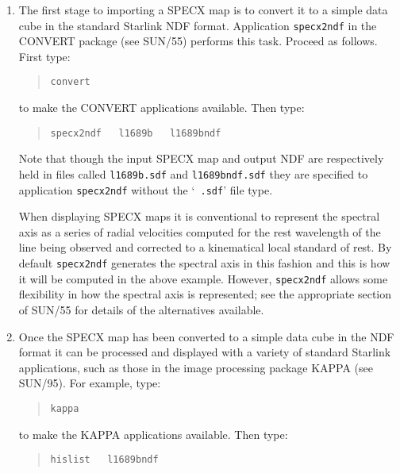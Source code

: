 \documentclass[twoside,11pt]{article}
\newcommand{\xref}[3]{#1}
\begin{document}
\begin{enumerate}

  \item The first stage to importing a SPECX map is to convert it to a
   simple data cube in the standard Starlink \xref{NDF}{sun33}{}
   format.  Application {\tt specx2ndf} in the CONVERT package
   (see \xref{SUN/55}{sun55}{}\cite{SUN55}) performs this task.
   Proceed as follows.  First type:

  \begin{quote}
   {\tt convert}
  \end{quote}

   to make the CONVERT applications available.  Then type:

  \begin{quote}
   {\tt specx2ndf ~ l1689b ~ l1689bndf}
  \end{quote}

   Note that though the input SPECX map and output NDF are respectively
   held in files called {\tt l1689b.sdf} and {\tt l1689bndf.sdf}
   they are specified to application {\tt specx2ndf} without the `{\tt
   .sdf}' file type.

   When displaying SPECX maps it is conventional to represent the
   spectral axis as a series of radial velocities computed for the
   rest wavelength of the line being observed and corrected to a
   kinematical local standard of rest.  By default {\tt specx2ndf}
   generates the spectral axis in this fashion and this is how it will
   be computed in the above example.  However, {\tt specx2ndf} allows
   some flexibility in how the spectral axis is represented; see
   \xref{the appropriate section of SUN/55}{sun55}{SPECX2NDF} for
   details of the alternatives available.

  \item Once the SPECX map has been converted to a simple data cube in
   the NDF format it can be processed and displayed with a variety
   of standard Starlink applications, such as those in the image
   processing package KAPPA (see \xref{SUN/95}{sun95}{}\cite{SUN95}).
   For example, type:

  \begin{quote}
   {\tt kappa}
  \end{quote}

   to make the KAPPA applications available.  Then type:

  \begin{quote}
   {\tt hislist ~ l1689bndf}
  \end{quote}


\end{enumerate}
\end{document}
